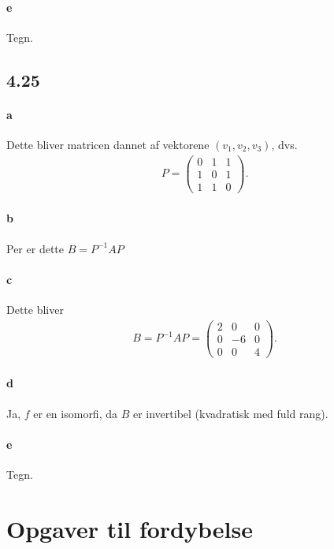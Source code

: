 			\paragraph{e} Tegn.

		\subsection{4.25}

			\paragraph{a} Dette bliver matricen dannet af vektorene $(v_1, v_2, v_3)$, dvs.
			    \begin{align*}
					P = \left(\begin{array}{rrr} 0 & 1 & 1 \\ 1 & 0 & 1 \\ 1 & 1 & 0 \end{array}\right).
				\end{align*}

			\paragraph{b} Per \cite[Sætning 4.4.14]{hesselholt2017} er dette $B=P^{-1}AP$

			\paragraph{c} Dette bliver
				\begin{align*}
					B = P^{-1}AP = \left(\begin{array}{rrr} {2} & {0} & {0} \\ {0} & {-6} & {0} \\ 0 & 0 & 4 \end{array}\right).
				\end{align*} 

			\paragraph{d} Ja, $f$ er en isomorfi, da $B$ er invertibel (kvadratisk med fuld rang).

			\paragraph{e} Tegn.



	\section{Opgaver til fordybelse}

